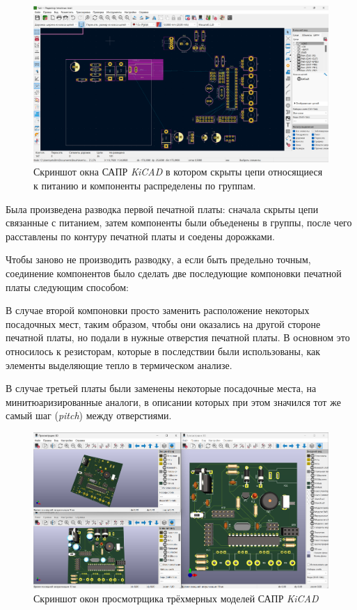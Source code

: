 \begin{figure}[H]
  \centering
  \includegraphics[scale = 0.20]{../img/scrot/Screenshot-2024-05-02-173914.png}
 \caption{Скриншот окна САПР \textit{KiCAD} в котором скрыты цепи относящиеся к питанию и компоненты распределены по группам.}
\end{figure}

Была произведена разводка первой печатной платы:
сначала скрыты цепи связанные с питанием, затем компоненты были объеденены в группы, после чего расставлены по контуру печатной платы и соедены дорожками.

Чтобы заново не производить разводку, а если быть предельно точным,
соединение компонентов было сделать две последующие компоновки печатной платы следующим способом:


В случае второй компоновки просто заменить расположение некоторых посадочных мест, таким образом, чтобы они оказались на другой стороне печатной платы, но подали в нужные отверстия печатной платы. В основном это относилось к резисторам, которые в последствии были использованы, как элементы выделяющие тепло в термическом анализе.


В случае третьей платы были заменены некоторые посадочные места, на минитюаризированные аналоги, в описании которых при этом значился тот же самый шаг (\textit{pitch}) между отверстиями.

\begin{figure}[H]
  \centering
  \includegraphics[scale = 0.20]{../img/scrot/Screenshot-2024-05-07-112847.png}
 \caption{Скриншот окон просмотрщика трёхмерных моделей САПР \textit{KiCAD}}
\end{figure}


